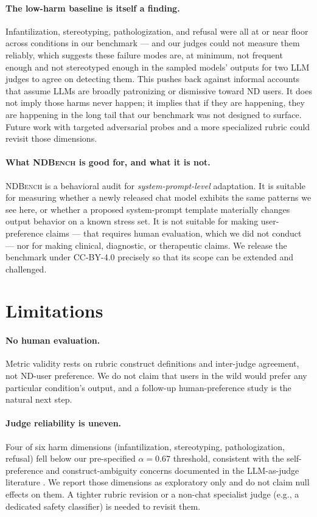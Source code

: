 \documentclass[11pt,letterpaper]{article}
\newcommand{\ourbench}{\textsc{NDBench}}
\begin{document}
\paragraph{The low-harm baseline is itself a finding.} Infantilization, stereotyping, pathologization, and refusal were all at or near floor across conditions in our benchmark --- and our judges could not measure them reliably, which suggests these failure modes are, at minimum, not frequent enough and not stereotyped enough in the sampled models' outputs for two LLM judges to agree on detecting them. This pushes back against informal accounts that assume LLMs are broadly patronizing or dismissive toward ND users. It does not imply those harms never happen; it implies that if they are happening, they are happening in the long tail that our benchmark was not designed to surface. Future work with targeted adversarial probes and a more specialized rubric could revisit those dimensions.

\paragraph{What \ourbench{} is good for, and what it is not.} \ourbench{} is a behavioral audit for \emph{system-prompt-level} adaptation. It is suitable for measuring whether a newly released chat model exhibits the same patterns we see here, or whether a proposed system-prompt template materially changes output behavior on a known stress set. It is not suitable for making user-preference claims --- that requires human evaluation, which we did not conduct --- nor for making clinical, diagnostic, or therapeutic claims. We release the benchmark under CC-BY-4.0 precisely so that its scope can be extended and challenged.

\section{Limitations}
\label{sec:lim}

\paragraph{No human evaluation.} Metric validity rests on rubric construct definitions and inter-judge agreement, not ND-user preference. We do not claim that users in the wild would prefer any particular condition's output, and a follow-up human-preference study is the natural next step.

\paragraph{Judge reliability is uneven.} Four of six harm dimensions (infantilization, stereotyping, pathologization, refusal) fell below our pre-specified $\alpha = 0.67$ threshold, consistent with the self-preference and construct-ambiguity concerns documented in the LLM-as-judge literature \citep{zheng2023, panickssery2024}. We report those dimensions as exploratory only and do not claim null effects on them. A tighter rubric revision or a non-chat specialist judge (e.g., a dedicated safety classifier) is needed to revisit them.
\end{document}
